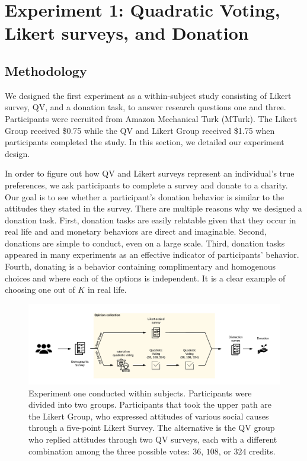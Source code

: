 \section{Experiment 1: Quadratic Voting, Likert surveys, and Donation}
\subsection{Methodology} \label{method-1}
We designed the first experiment as a within-subject study
consisting of Likert survey, QV, and a donation task,
to answer research questions one and three. 
Participants were recruited from Amazon Mechanical Turk (MTurk).
The Likert Group received \$0.75 
while the QV and Likert Group received \$1.75 
when participants completed the study.
In this section, 
we detailed our experiment design.

In order to figure out 
how QV and Likert surveys 
represent an individual's true preferences,
we ask participants to complete a survey
and donate to a charity.
Our goal is to see 
whether a participant's donation behavior is similar to 
the attitudes they stated in the survey.
There are multiple reasons
why we designed a donation task.
First, donation tasks are easily relatable
given that they occur in real life and
and monetary behaviors are direct and imaginable.
Second, donations are simple to conduct,
even on a large scale.
Third, donation tasks appeared in many experiments 
\cite{Xiao2019, benz2008people, gendall2010effect} 
as an effective indicator of participants' behavior.
Fourth, donating is a behavior containing
complimentary and homogenous choices and
where each of the options is independent.
It is a clear example of choosing one out of $K$ in real life.

\begin{figure}[htpb]
    \centering
    \includegraphics[width=\textwidth, keepaspectratio=true]{content/image/exp1_flow.pdf}
    \caption{
        Experiment one conducted within subjects. Participants were divided into two groups. Participants that took the upper path are the Likert Group, who expressed attitudes of various social causes through a five-point Likert Survey. The alternative is the QV group who replied attitudes through two QV surveys, each with a different combination among the three possible votes: $36$, $108$, or $324$ credits.
    }
    \label{fig:exp1_image_flow}
\end{figure}

